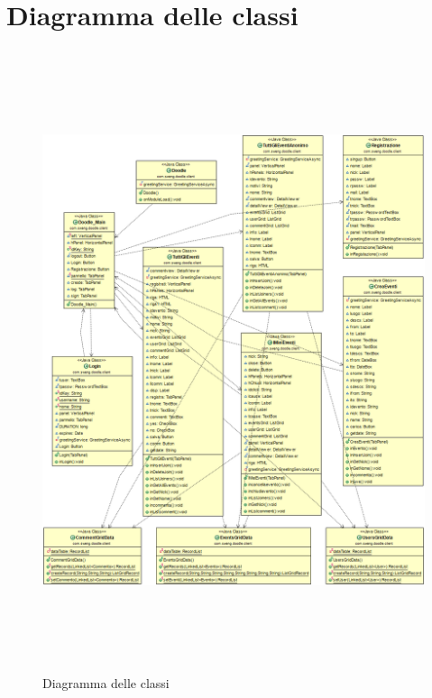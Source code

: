 \chapter{Diagramma delle classi}

\begin{figure}[!ht]
\centering
\includegraphics[width=15cm, height=18.2cm]{img/diagrammaclassi.png}
\caption{Diagramma delle classi}
\label{fig:diagclassi}
\end{figure}